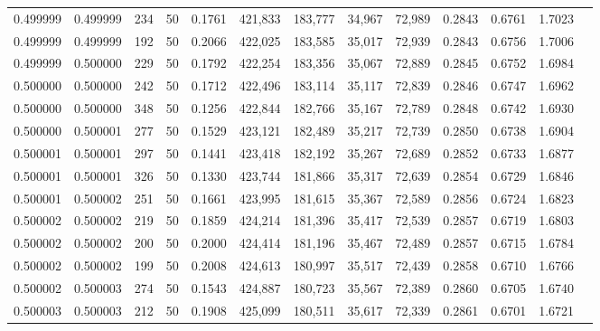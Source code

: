 \begin{tabular}{rrrrrrrrrrrrr}
0.499999 & 0.499999 &   234 &  50 &                                     0.1761 & 421,833 & 183,777 &  34,967 &  72,989 & 0.2843 & 0.6761 & 1.7023 \\
0.499999 & 0.499999 &   192 &  50 &                                     0.2066 & 422,025 & 183,585 &  35,017 &  72,939 & 0.2843 & 0.6756 & 1.7006 \\
0.499999 & 0.500000 &   229 &  50 &                                     0.1792 & 422,254 & 183,356 &  35,067 &  72,889 & 0.2845 & 0.6752 & 1.6984 \\
0.500000 & 0.500000 &   242 &  50 &                                     0.1712 & 422,496 & 183,114 &  35,117 &  72,839 & 0.2846 & 0.6747 & 1.6962 \\
0.500000 & 0.500000 &   348 &  50 &                                     0.1256 & 422,844 & 182,766 &  35,167 &  72,789 & 0.2848 & 0.6742 & 1.6930 \\
0.500000 & 0.500001 &   277 &  50 &                                     0.1529 & 423,121 & 182,489 &  35,217 &  72,739 & 0.2850 & 0.6738 & 1.6904 \\
0.500001 & 0.500001 &   297 &  50 &                                     0.1441 & 423,418 & 182,192 &  35,267 &  72,689 & 0.2852 & 0.6733 & 1.6877 \\
0.500001 & 0.500001 &   326 &  50 &                                     0.1330 & 423,744 & 181,866 &  35,317 &  72,639 & 0.2854 & 0.6729 & 1.6846 \\
0.500001 & 0.500002 &   251 &  50 &                                     0.1661 & 423,995 & 181,615 &  35,367 &  72,589 & 0.2856 & 0.6724 & 1.6823 \\
0.500002 & 0.500002 &   219 &  50 &                                     0.1859 & 424,214 & 181,396 &  35,417 &  72,539 & 0.2857 & 0.6719 & 1.6803 \\
0.500002 & 0.500002 &   200 &  50 &                                     0.2000 & 424,414 & 181,196 &  35,467 &  72,489 & 0.2857 & 0.6715 & 1.6784 \\
0.500002 & 0.500002 &   199 &  50 &                                     0.2008 & 424,613 & 180,997 &  35,517 &  72,439 & 0.2858 & 0.6710 & 1.6766 \\
0.500002 & 0.500003 &   274 &  50 &                                     0.1543 & 424,887 & 180,723 &  35,567 &  72,389 & 0.2860 & 0.6705 & 1.6740 \\
0.500003 & 0.500003 &   212 &  50 &                                     0.1908 & 425,099 & 180,511 &  35,617 &  72,339 & 0.2861 & 0.6701 & 1.6721 \\

\end{tabular}
